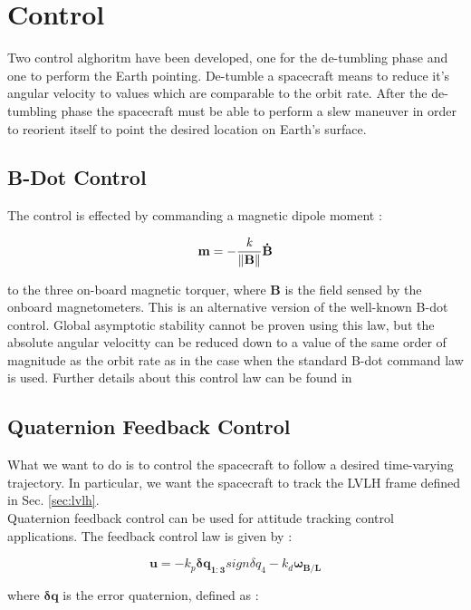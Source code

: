 \documentclass[11pt,a4paper]{report}
\begin{document}
\chapter{Control} 
\label{chap:control}
Two control alghoritm have been developed, one for the de-tumbling phase and one to perform the Earth pointing.
De-tumble a spacecraft means to reduce it's angular velocity to values which are comparable to the orbit rate.
After the de-tumbling phase the spacecraft must be able to perform a slew maneuver in order to reorient itself to point the desired location on Earth's surface.

\section{B-Dot Control}
The control is effected by commanding a magnetic dipole moment : 

\begin{equation}
 \mathbf{m} = - \frac{\mathit{k}}{\left\lVert\mathbf{B}\right\rVert}\mathbf{\dot{B}}
\end{equation}

to the three on-board magnetic torquer, where $\mathbf{B}$ is the field sensed by the onboard magnetometers. This is an alternative version of the well-known B-dot control. Global asymptotic stability cannot be proven using this law, but the absolute angular velocitty can be reduced down to a value of the same order of magnitude as the orbit rate as in the case when the standard B-dot command law is used. 
Further details about this control law can be found in \cite{Ref:Articles:Lovera}

\section{Quaternion Feedback Control}
What we want to do is to control the spacecraft to follow a desired time-varying trajectory. In particular, we want the spacecraft to track the LVLH frame defined in Sec. \ref{sec:lvlh}.\\
Quaternion feedback control can be used for attitude tracking control applications.
The feedback control law is given by :

\begin{equation}
\label{eq:idealcontrol}
 \mathbf{u} = -\mathit{k_p}\mathbf{\delta q_{1:3}}sign\mathit{\delta q_{4}} - \mathit{k_d}\mathbf{\omega_{B/L}}
\end{equation}

where $\mathbf{\delta q}$ is the error quaternion, defined as :
\end{document}
